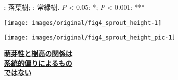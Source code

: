 \documentclass[a0, 36pt, plainboxedsections]{sciposter} %
\begin{document}
\begin{multicols}{2}
\begin{mdframed}[style=subsection.frame,frametitle=\textbf{\huge{\ding{194}}\LARGE{萌芽性が強いほど自己被陰を回避}}]
\begin{figure}
\begin{minipage}{0.75\hsize}
   \flushleft\vspace{-1em}\hspace*{0.6em}
    {\tiny \textcolor[HTML]{F9B04F}{\faCircle}: 落葉樹; \textcolor[HTML]{469B9A}{\faCircle}: 常緑樹.
		\hspace{0.6em}\textit{P} < 0.05: *; \textit{P} < 0.001: ***}
 \end{minipage}
\end{figure}

\end{mdframed}

\columnbreak
\begin{mdframed}[style=subsection.frame,frametitle=\textbf{\huge{\ding{193}}\LARGE{萌芽性が強くなるほど樹高が低下}}]

\vspace{-1.0em}
\begin{figure}
	\centering
		\texttt{[image: images/original/fig4\_sprout\_height-1]}
	
	\vspace{-1.0em}\flushleft
\end{figure}

\vspace{-1.0em}
\begin{figure}
 \begin{minipage}{0.5\hsize}
  \centering
   \texttt{[image: images/original/fig4\_sprout\_height\_pic-1]}
   
 \end{minipage}
 \begin{minipage}{0.5\hsize}
{\large \faHandLeft \textbf{\underline{萌芽性と樹高の関係は}}\\ \textbf{\underline{系統的偏りによるもの}}\\\textbf{\underline{ではない}}}
 \end{minipage}
\end{figure}

\end{mdframed}

\end{multicols}

\end{document}
